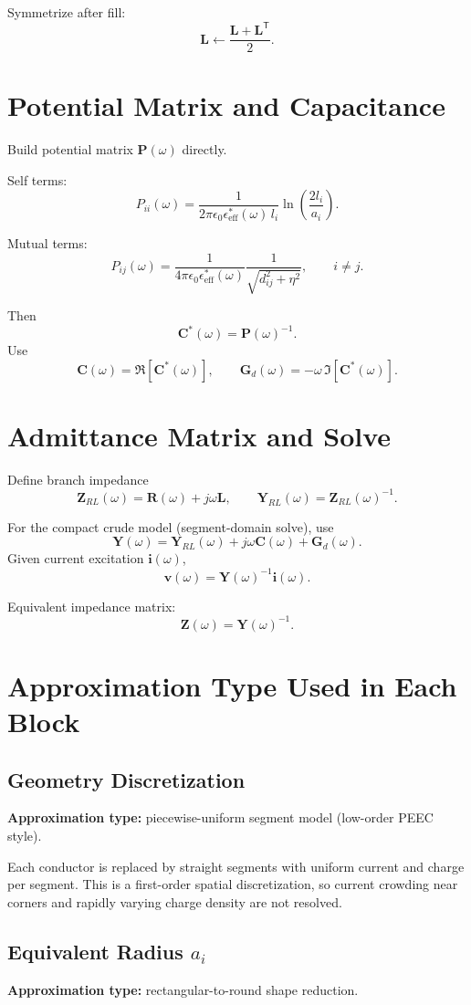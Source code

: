 \documentclass[11pt]{article}
\begin{document}
Symmetrize after fill:
\[
\bm{L}\leftarrow\frac{\bm{L}+\bm{L}^\mathsf{T}}{2}.
\]

\section{Potential Matrix and Capacitance}
Build potential matrix $\bm{P}(\omega)$ directly.

Self terms:
\[
P_{ii}(\omega)=\frac{1}{2\pi\epsilon_0\epsilon_{\mathrm{eff}}^*(\omega)\,l_i}
\ln\!\left(\frac{2l_i}{a_i}\right).
\]

Mutual terms:
\[
P_{ij}(\omega)=\frac{1}{4\pi\epsilon_0\epsilon_{\mathrm{eff}}^*(\omega)}
\frac{1}{\sqrt{d_{ij}^2+\eta^2}},
\qquad i\neq j.
\]

Then
\[
\bm{C}^*(\omega)=\bm{P}(\omega)^{-1}.
\]
Use
\[
\bm{C}(\omega)=\Re[\bm{C}^*(\omega)],
\qquad
\bm{G}_d(\omega)=-\omega\,\Im[\bm{C}^*(\omega)].
\]

\section{Admittance Matrix and Solve}
Define branch impedance
\[
\bm{Z}_{RL}(\omega)=\bm{R}(\omega)+j\omega\bm{L},
\qquad
\bm{Y}_{RL}(\omega)=\bm{Z}_{RL}(\omega)^{-1}.
\]

For the compact crude model (segment-domain solve), use
\[
\bm{Y}(\omega)=\bm{Y}_{RL}(\omega)+j\omega\bm{C}(\omega)+\bm{G}_d(\omega).
\]
Given current excitation $\bm{i}(\omega)$,
\[
\bm{v}(\omega)=\bm{Y}(\omega)^{-1}\bm{i}(\omega).
\]

Equivalent impedance matrix:
\[
\bm{Z}(\omega)=\bm{Y}(\omega)^{-1}.
\]

\section{Approximation Type Used in Each Block}
\subsection{Geometry Discretization}
\textbf{Approximation type:} piecewise-uniform segment model (low-order PEEC style).

Each conductor is replaced by straight segments with uniform current and charge per segment.
This is a first-order spatial discretization, so current crowding near corners and rapidly varying charge density are not resolved.

\subsection{Equivalent Radius $a_i$}
\textbf{Approximation type:} rectangular-to-round shape reduction.
\end{document}
